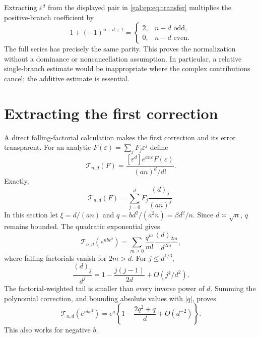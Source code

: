 \documentclass[11pt,letterpaper]{article}
\numberwithin{equation}{section}
\theoremstyle{definition}\newtheorem{definition}[theorem]{Definition}
\theoremstyle{remark}\newtheorem{remark}[theorem]{Remark}
\newcommand{\eps}{\varepsilon}
\newcommand{\coef}[1]{\left[#1\right]}
\newcommand{\fall}[2]{(#1)_{\underline{#2}}}
\begin{document}
Extracting $\eps^d$ from the displayed pair in \eqref{gal:ep:eq:transfer} multiplies the positive-branch coefficient by
\begin{equation}\label{gal:ep:eq:factor2}
1+(-1)^{n+d+1}=
\begin{cases}2,&n-d\text{ odd},\\0,&n-d\text{ even}.
\end{cases}
\end{equation}
The full series has precisely the same parity. This proves the normalization without a dominance or noncancellation assumption. In particular, a relative single-branch estimate would be inappropriate where the complex contributions cancel; the additive estimate is essential.

\section{Extracting the first correction}\label{gal:ep:sec:first}
A direct falling-factorial calculation makes the first correction and its error transparent. For an analytic $F(\eps)=\sum_jF_j\eps^j$ define
\[
\mathcal T_{n,d}(F)
=\frac{\coef{\eps^d}e^{an\eps}F(\eps)}{(an)^d/d!}.
\]
Exactly,
\begin{equation}\label{gal:ep:eq:exactT}
\mathcal T_{n,d}(F)=\sum_{j=0}^d F_j\frac{\fall d j}{(an)^j}.
\end{equation}
In this section let $\xi=d/(an)$ and $q=bd^2/(a^2n)=\beta d^2/n$. Since $d\asymp\sqrt n$, $q$ remains bounded. The quadratic exponential gives
\[
\mathcal T_{n,d}(e^{nb\eps^2})
=\sum_{m\ge0}\frac{q^m}{m!}\frac{\fall d {2m}}{d^{2m}},
\]
where falling factorials vanish for $2m>d$. For $j\le d^{1/3}$,
\[
\frac{\fall d j}{d^j}=1-\frac{j(j-1)}{2d}+O(j^4/d^2).
\]
The factorial-weighted tail is smaller than every inverse power of $d$. Summing the polynomial correction, and bounding absolute values with $|q|$, proves
\begin{equation}\label{gal:ep:eq:quadratic}
\mathcal T_{n,d}(e^{nb\eps^2})
=e^q\left\{1-\frac{2q^2+q}{d}+O(d^{-2})\right\}.
\end{equation}
This also works for negative $b$.
\end{document}
